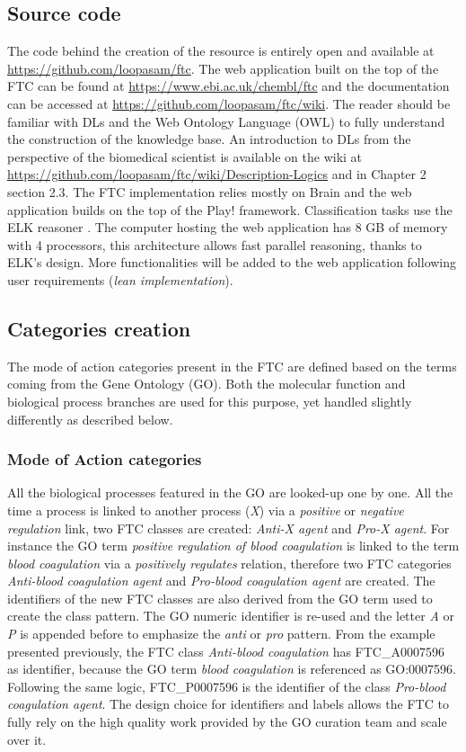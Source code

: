 \subsection{Source code}
The code behind the creation of the resource is entirely open and available at \url{https://github.com/loopasam/ftc}. The web application built on the top of the FTC can be found at \url{https://www.ebi.ac.uk/chembl/ftc} and the documentation can be accessed at \url{https://github.com/loopasam/ftc/wiki}. The reader should be familiar with DLs and the Web Ontology Language (OWL) to fully understand the construction of the knowledge base. An introduction to DLs from the perspective of the biomedical scientist is available on the wiki at \url{https://github.com/loopasam/ftc/wiki/Description-Logics} and in Chapter 2 section 2.3. The FTC implementation relies mostly on Brain \citep{croset2013brain} and the web application builds on the top of the Play! framework. Classification tasks use the ELK reasoner \citep{kazakov2013incredible}. The computer hosting the web application has 8 GB of memory with 4 processors, this architecture allows fast parallel reasoning, thanks to ELK's design. More functionalities will be added to the web application following user requirements (\emph{lean implementation}).

\subsection{Categories creation}
\label{catfunc}

The mode of action categories present in the FTC are defined based on the terms coming from the Gene Ontology (GO). Both the molecular function and biological process branches are used for this purpose, yet handled slightly differently as described below.

\subsubsection{Mode of Action categories}
All the biological processes featured in the GO are looked-up one by one. All the time a process is linked to another process (\emph{X}) via a \emph{positive} or \emph{negative regulation} link, two FTC classes are created: \emph{Anti-X agent} and \emph{Pro-X agent}. For instance the GO term \emph{positive regulation of blood coagulation} is linked to the term \emph{blood coagulation} via a \emph{positively regulates} relation, therefore two FTC categories \emph{Anti-blood coagulation agent} and \emph{Pro-blood coagulation agent} are created. The identifiers of the new FTC classes are also derived from the GO term used to create the class pattern. The GO numeric identifier is re-used and the letter \emph{A} or \emph{P} is appended before to emphasize the \emph{anti} or \emph{pro} pattern. From the example presented previously, the FTC class \emph{Anti-blood coagulation} has FTC\_A0007596 as identifier, because the GO term \emph{blood coagulation} is referenced as GO:0007596. Following the same logic, FTC\_P0007596 is the identifier of the class \emph{Pro-blood coagulation agent}. The design choice for identifiers and labels allows the FTC to fully rely on the high quality work provided by the GO curation team and scale over it.

